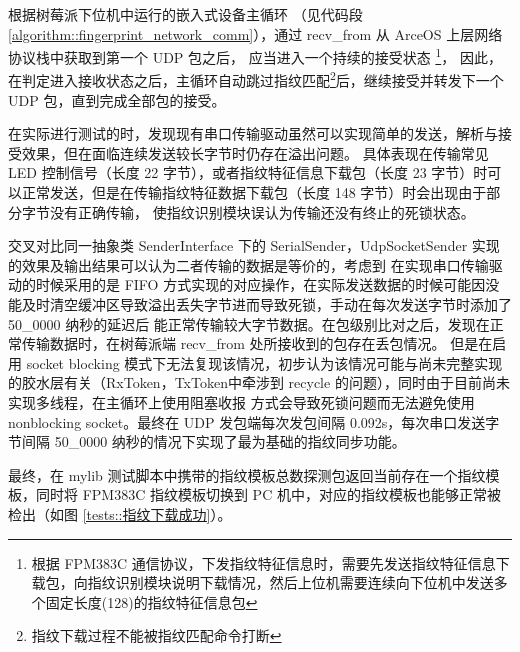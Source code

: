     根据树莓派下位机中运行的嵌入式设备主循环 （见代码段 \ref{algorithm::fingerprint_network_comm}），通过 recv\_from 从 ArceOS 上层网络协议栈中获取到第一个 UDP 包之后，
    应当进入一个持续的接受状态
    \footnote{根据 FPM383C 通信协议，下发指纹特征信息时，需要先发送指纹特征信息下载包，向指纹识别模块说明下载情况，然后上位机需要连续向下位机中发送多个固定长度(128)的指纹特征信息包}，
    因此，在判定进入接收状态之后，主循环自动跳过指纹匹配\footnote{指纹下载过程不能被指纹匹配命令打断}后，继续接受并转发下一个 UDP 包，直到完成全部包的接受。

    在实际进行测试的时，发现现有串口传输驱动虽然可以实现简单的发送，解析与接受效果，但在面临连续发送较长字节时仍存在溢出问题。
    具体表现在传输常见 LED 控制信号（长度 22 字节），或者指纹特征信息下载包（长度 23 字节）时可以正常发送，但是在传输指纹特征数据下载包（长度 148 字节）时会出现由于部分字节没有正确传输，
    使指纹识别模块误认为传输还没有终止的死锁状态。
    
    交叉对比同一抽象类 SenderInterface 下的 SerialSender，UdpSocketSender 实现的效果及输出结果可以认为二者传输的数据是等价的，考虑到
    在实现串口传输驱动的时候采用的是 FIFO 方式实现的对应操作，在实际发送数据的时候可能因没能及时清空缓冲区导致溢出丢失字节进而导致死锁，手动在每次发送字节时添加了 50\_0000 纳秒的延迟后
    能正常传输较大字节数据。在包级别比对之后，发现在正常传输数据时，在树莓派端 recv\_from 处所接收到的包存在丢包情况。
    但是在启用 socket blocking 模式下无法复现该情况，初步认为该情况可能与尚未完整实现的胶水层有关（RxToken，TxToken中牵涉到 recycle 的问题），同时由于目前尚未实现多线程，在主循环上使用阻塞收报
    方式会导致死锁问题而无法避免使用 nonblocking socket。最终在 UDP 发包端每次发包间隔 0.092s，每次串口发送字节间隔 50\_0000 纳秒的情况下实现了最为基础的指纹同步功能。

    最终，在 mylib 测试脚本中携带的指纹模板总数探测包返回当前存在一个指纹模板，同时将 FPM383C 指纹模板切换到 PC 机中，对应的指纹模板也能够正常被检出（如图 \ref{tests::指纹下载成功}）。
    


